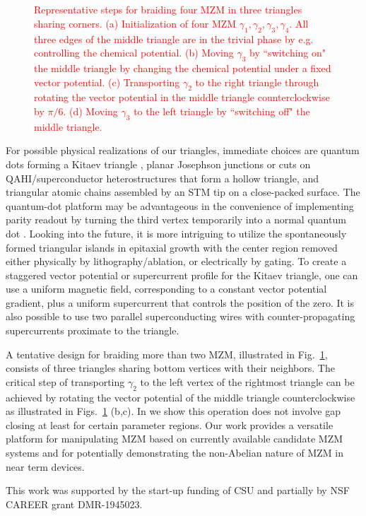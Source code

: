 \documentclass[aps,prb,showpacs,amsmath,twocolumn,amssymb,superscriptaddress]{revtex4-2}
\newcommand{\Red}[1]{\textcolor{red}{#1}}
\begin{document}
\begin{figure}[ht]
    \,
     \\
     \,
     \\
  \caption{\Red{Representative steps for braiding four MZM in three triangles sharing corners. (a) Initialization of four MZM $\gamma_1, \gamma_2, \gamma_3, \gamma_4$. All three edges of the middle triangle are in the trivial phase by e.g. controlling the chemical potential. (b) Moving $\gamma_3$ by ``switching on" the middle triangle by changing the chemical potential under a fixed vector potential. (c) Transporting $\gamma_2$ to the right triangle through rotating the vector potential in the middle triangle counterclockwise by $\pi/6$. (d) Moving $\gamma_3$ to the left triangle by ``switching off" the middle triangle.}}
  \label{fig:4MZMbraiding}
\end{figure}

For possible physical realizations of our triangles, immediate choices are quantum dots forming a Kitaev triangle \cite{dvirRealizationMinimalKitaev2023}, planar Josephson junctions or cuts on QAHI/superconductor heterostructures \cite{xieCreatingLocalizedMajorana2021} that form a hollow triangle, and triangular atomic chains assembled by an STM tip \cite{schneiderPrecursorsMajoranaModes2022} on a close-packed surface. The quantum-dot platform may be advantageous in the convenience of implementing parity readout by turning the third vertex temporarily into a normal quantum dot \cite{mishmashDephasingLeakageDynamics2020,parity_QD_readout_2020, fengProbingRobustMajorana2022}. Looking into the future, it is more intriguing to utilize the spontaneously formed triangular islands in epitaxial growth \cite{pietzschSpinResolvedElectronicStructure2006} with the center region removed either physically by lithography/ablation, or electrically by gating. To create a staggered vector potential or supercurrent profile for the Kitaev triangle, one can use a uniform magnetic field, corresponding to a constant vector potential gradient, plus a uniform supercurrent that controls the position of the zero. It is also possible to use two parallel superconducting wires with counter-propagating supercurrents proximate to the triangle.

A tentative design for braiding more than two MZM, illustrated in Fig.~\ref{fig:4MZMbraiding}, consists of three triangles sharing bottom vertices with their neighbors. The critical step of transporting $\gamma_2$ to the left vertex of the rightmost triangle can be achieved by rotating the vector potential of the middle triangle counterclockwise as illustrated in Figs.~\ref{fig:4MZMbraiding} (b,c). In \cite{supp} we show this operation does not involve gap closing at least for certain parameter regions. Our work provides a versatile platform for manipulating MZM based on currently available candidate MZM systems and for potentially demonstrating the non-Abelian nature of MZM in near term devices.


\begin{acknowledgements}
This work was supported by the start-up funding of CSU and partially by NSF CAREER grant DMR-1945023.
\end{acknowledgements}



\end{document}
